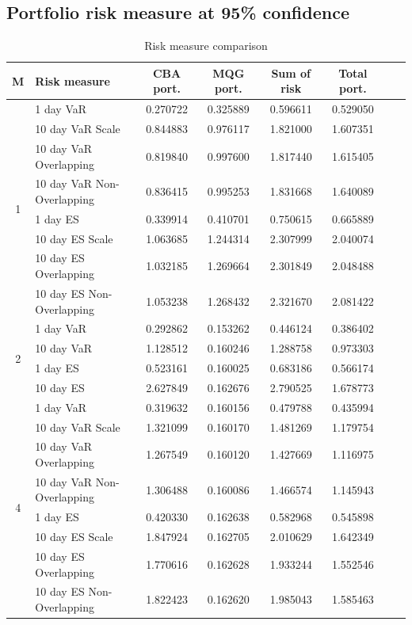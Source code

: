 \subsection{Portfolio risk measure at 95\% confidence}
\begin{table}[H]
    \centering
    \begin{tabular}{@{} c l c c c c c c@{}}
        \toprule
        \textbf{M} &\textbf{Risk measure} & {\textbf{CBA port.}} & \textbf{MQG port.} & \textbf{Sum of risk} & \textbf{Total port.}\\
        \midrule
        \multirow{8}{*}{1}&1 day VaR & 0.270722 & 0.325889 & 0.596611 & 0.529050 \\
        &10 day VaR Scale & 0.844883 & 0.976117 & 1.821000 & 1.607351 \\
        &10 day VaR Overlapping & 0.819840 & 0.997600 & 1.817440 & 1.615405 \\
        &10 day VaR Non-Overlapping & 0.836415 & 0.995253 & 1.831668 & 1.640089 \\
        &1 day ES & 0.339914 & 0.410701 & 0.750615 & 0.665889 \\
        &10 day ES Scale & 1.063685 & 1.244314 & 2.307999 & 2.040074 \\
        &10 day ES Overlapping & 1.032185 & 1.269664 & 2.301849 & 2.048488 \\
        &10 day ES Non-Overlapping & 1.053238 & 1.268432 & 2.321670 & 2.081422 \\
        \midrule
        \multirow{4}{*}{2}&1 day VaR & 0.292862 & 0.153262 & 0.446124 & 0.386402 \\
        &10 day VaR & 1.128512 & 0.160246 & 1.288758 & 0.973303 \\
        &1 day ES & 0.523161 & 0.160025 & 0.683186 & 0.566174 \\
        &10 day ES & 2.627849 & 0.162676 & 2.790525 & 1.678773 \\
        \midrule
        \multirow{8}{*}{4}&1 day VaR & 0.319632 & 0.160156 & 0.479788 & 0.435994 \\
        &10 day VaR Scale & 1.321099 & 0.160170 & 1.481269 & 1.179754 \\
        &10 day VaR Overlapping & 1.267549 & 0.160120 & 1.427669 & 1.116975 \\
        &10 day VaR Non-Overlapping & 1.306488 & 0.160086 & 1.466574 & 1.145943 \\
        &1 day ES & 0.420330 & 0.162638 & 0.582968 & 0.545898 \\
        &10 day ES Scale & 1.847924 & 0.162705 & 2.010629 & 1.642349 \\
        &10 day ES Overlapping & 1.770616 & 0.162628 & 1.933244 & 1.552546 \\
        &10 day ES Non-Overlapping & 1.822423 & 0.162620 & 1.985043 & 1.585463 \\
        \bottomrule
    \end{tabular}
    \caption{Risk measure comparison}
    \label{tab:risk_measure_comparison}
\end{table}